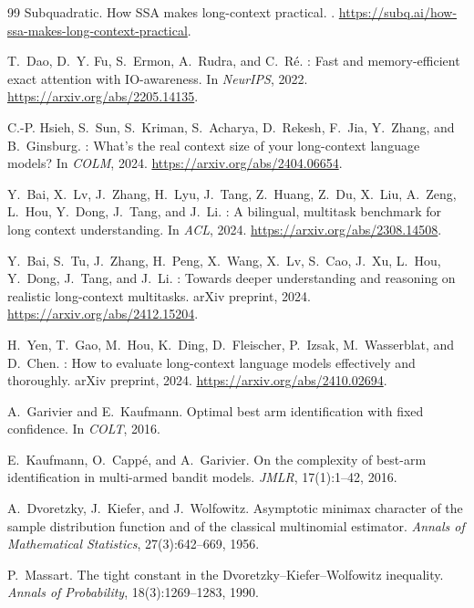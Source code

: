 \documentclass[11pt]{article}
\theoremstyle{remark}
\begin{document}
\begin{thebibliography}{99}
Subquadratic.
\newblock How {SSA} makes long-context practical.
.
\newblock \url{https://subq.ai/how-ssa-makes-long-context-practical}.

T.~Dao, D.~Y. Fu, S.~Ermon, A.~Rudra, and C.~R\'e.
: Fast and memory-efficient exact attention with {IO}-awareness.
\newblock In \emph{NeurIPS}, 2022.
\newblock \url{https://arxiv.org/abs/2205.14135}.

C.-P. Hsieh, S.~Sun, S.~Kriman, S.~Acharya, D.~Rekesh, F.~Jia, Y.~Zhang, and B.~Ginsburg.
: What's the real context size of your long-context language models?
\newblock In \emph{COLM}, 2024.
\newblock \url{https://arxiv.org/abs/2404.06654}.

Y.~Bai, X.~Lv, J.~Zhang, H.~Lyu, J.~Tang, Z.~Huang, Z.~Du, X.~Liu, A.~Zeng, L.~Hou, Y.~Dong, J.~Tang, and J.~Li.
: A bilingual, multitask benchmark for long context understanding.
\newblock In \emph{ACL}, 2024.
\newblock \url{https://arxiv.org/abs/2308.14508}.

Y.~Bai, S.~Tu, J.~Zhang, H.~Peng, X.~Wang, X.~Lv, S.~Cao, J.~Xu, L.~Hou, Y.~Dong, J.~Tang, and J.~Li.
: Towards deeper understanding and reasoning on realistic long-context multitasks.
\newblock arXiv preprint, 2024.
\newblock \url{https://arxiv.org/abs/2412.15204}.

H.~Yen, T.~Gao, M.~Hou, K.~Ding, D.~Fleischer, P.~Izsak, M.~Wasserblat, and D.~Chen.
: How to evaluate long-context language models effectively and thoroughly.
\newblock arXiv preprint, 2024.
\newblock \url{https://arxiv.org/abs/2410.02694}.

A.~Garivier and E.~Kaufmann.
\newblock Optimal best arm identification with fixed confidence.
\newblock In \emph{COLT}, 2016.

E.~Kaufmann, O.~Capp\'e, and A.~Garivier.
\newblock On the complexity of best-arm identification in multi-armed bandit models.
\newblock \emph{JMLR}, 17(1):1--42, 2016.

A.~Dvoretzky, J.~Kiefer, and J.~Wolfowitz.
\newblock Asymptotic minimax character of the sample distribution function and of the classical multinomial estimator.
\newblock \emph{Annals of Mathematical Statistics}, 27(3):642--669, 1956.

P.~Massart.
\newblock The tight constant in the Dvoretzky--Kiefer--Wolfowitz inequality.
\newblock \emph{Annals of Probability}, 18(3):1269--1283, 1990.

\end{thebibliography}
\end{document}
